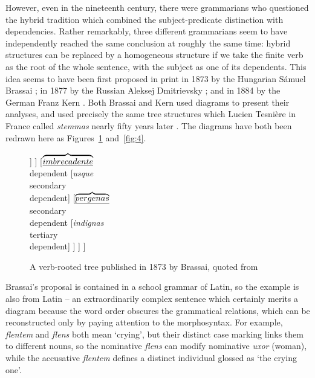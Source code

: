 \documentclass[output=paper,biblatex,babelshorthands,newtxmath,draftmode,colorlinks,citecolor=brown]{langscibook}
\begin{document}
However, even in the nineteenth century, there were grammarians who questioned the hybrid tradition
which combined the subject-predicate distinction with dependencies. Rather remarkably, three
different grammarians seem to have independently reached the same conclusion at roughly the same
time: hybrid structures can be replaced by a homogeneous structure if we take the finite verb as the
root of the whole sentence, with the subject as one of its dependents. This idea seems to have been
first proposed in print in 1873 by the Hungarian Sámuel Brassai
\citep{Imrenyi2013a,ImrenyiVladar2020a-u}; in 1877 by the Russian Aleksej Dmitrievsky
\citep{Seriot2004}; and in 1884 by the German Franz Kern \citep{Kern1884a-u}. Both Brassai and
Kern used diagrams to present their analyses, and used precisely the same tree structures which
Lucien Tesnière in France called \emph{stemmas} nearly fifty years later
\citep{Tesniere59a-u,Tesniere2015a-u}. The diagrams have both been redrawn here as
Figures~\ref{fig:3} and~\ref{fig:4}.

\begin{figure}
	\centering
\begin{forest}
[\emph{tenebat}\\governing verb
	[\emph{flentem}\\dependent]
	[\emph{Uxor}\\dependent
		[\emph{amans}\\attribute]
		[\emph{ipsa}\\attribute]
		[\emph{flens}\\attribute
			[\emph{acrius}\\tertiary\\dependent]
		]
	]
	[$\overbrace{\emph{imbre cadente}}$\\dependent
		[\emph{usque}\\secondary\\dependent]
		[$\overbrace{\emph{per genas}}$\\secondary\\dependent
			[\emph{indignas}\\tertiary\\dependent]
		]
	]
]
\end{forest}
\caption{A verb-rooted tree published in 1873 by Brassai, quoted from }\label{fig:3}
\end{figure}
 
Brassai's proposal is contained in a school grammar of Latin, so the example is also from Latin – an
extraordinarily complex sentence which certainly merits a diagram because the word order obscures the grammatical relations, which can be reconstructed only by paying attention to the morphosyntax. For example, \emph{flentem} and \emph{flens} both mean `crying', but their distinct case marking links them to different nouns, so the nominative \emph{flens} can modify nominative \emph{uxor} (woman), while the accusative \emph{flentem} defines a distinct individual glossed as `the crying one'.
\end{document}
